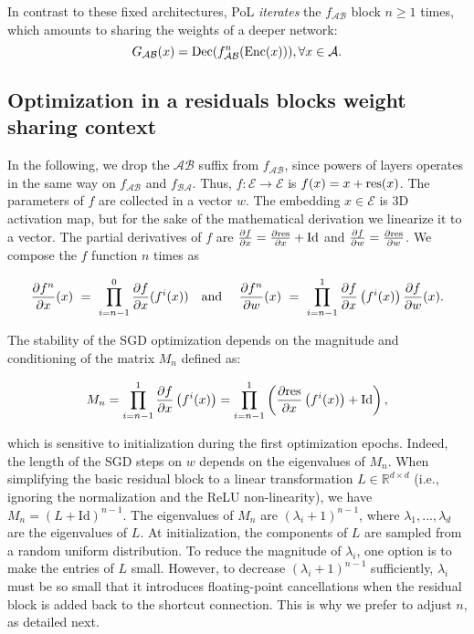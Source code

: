 \documentclass[a4paper,10pt]{extarticle}
\def\Ac{\mathcal A}
\def\Bc{\mathcal B}
\def\Ec{\mathcal E}
\begin{document}
In contrast to these fixed architectures, PoL \emph{iterates} the $f_{\Ac\Bc}$ block $n \geq 1$ times, which amounts to sharing the weights of a deeper network:
\begin{equation}
    G_{\Ac\Bc}(x) = \Dec(f_{\Ac\Bc}^n(\Enc(x))), \forall x \in \Ac.
\end{equation}


\subsection{Optimization in a residuals blocks weight sharing context}

In the following, we drop the $\Ac\Bc$ suffix from $f_{\Ac\Bc}$, since powers of layers operates in the same way on $f_{\Ac\Bc}$ and $f_{\Bc\Ac}$. Thus, 
$ f:\Ec \rightarrow \Ec$ is $f(x) = x + \mathrm{res}(x)$. 
The parameters of $f$ are collected in a vector $w$.
The embedding $x\in \Ec$ is 3D activation map, but for the sake of the mathematical derivation we linearize it to a vector.
The partial derivatives of $f$ are $\frac{\partial f}{\partial x} =\frac{\partial \mathrm{res}}{\partial x} + \mathrm{Id}$ and $\frac{\partial f}{\partial w} =\frac{\partial \mathrm{res}}{\partial w}$.
We compose the $f$ function $n$ times as


\begin{equation}
\frac{\partial f^n}{\partial x}(x)~=~\prod_{i=n-1}^0 
    \frac{\partial f}{\partial x}(f^i(x))
\textrm{\quad and \quad  }
    \frac{\partial f^n}{\partial w}(x)~=~\prod_{i=n-1}^1 
    \frac{\partial f}{\partial x}\left(f^i(x)\right)
    \frac{\partial f}{\partial w}(x). 
\end{equation}


The stability of the SGD optimization depends on the magnitude and conditioning of the matrix $M_n$ defined as:

\begin{equation}
M_n = \prod_{i=n-1}^1 
    \frac{\partial f}{\partial x}\left(f^i(x)\right)
= \prod_{i=n-1}^1 
    \left( 
    \frac{\partial \mathrm{res}}{\partial x}\left(f^i(x)\right)
    + \textrm{Id}
    \right), 
\end{equation}

which is sensitive to initialization during the first optimization epochs.
Indeed, the length of the SGD steps on $w$ depends on the eigenvalues of $M_n$.
When simplifying the basic residual block to a linear transformation $L\in \mathbb{R}^{d\times d}$ (i.e., ignoring the normalization and the ReLU non-linearity), we have $M_n = (L + \mathrm{Id})^{n-1} $.
The eigenvalues of $M_n$ are $(\lambda_i + 1)^{n-1}$, where $\lambda_1, ...,\lambda_d$ are the eigenvalues of $L$. 
At initialization, the components of $L$ are sampled from a random uniform distribution. 
To reduce the magnitude of $\lambda_i$, one option is to make the entries of $L$ small. 
However, to decrease  $(\lambda_i + 1)^{n-1}$ sufficiently, $\lambda_i$ must be so small that it introduces floating-point cancellations when the residual block is added back to the shortcut connection. 
This is why we prefer to adjust $n$, as detailed next.
\end{document}
